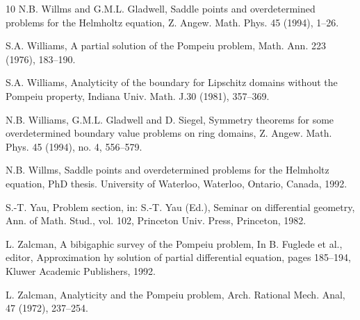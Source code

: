 \documentclass[12pt]{article}
\numberwithin{equation}{section}
\numberwithin{equation}{section}
\begin{document}
\begin{thebibliography}{10}
 N.B. Willms and G.M.L. Gladwell, Saddle points and overdetermined problems for the Helmholtz equation, Z. Angew. Math. Phys. 45 (1994), 1--26.

 S.A. Williams, A partial solution of the Pompeiu problem, Math. Ann. 223 (1976), 183--190.

 S.A. Williams, Analyticity of the boundary for Lipschitz domains without the Pompeiu property, Indiana Univ. Math. J.30 (1981), 357--369.

 N.B. Williams, G.M.L. Gladwell and D. Siegel, Symmetry theorems for some overdetermined boundary value problems on ring domains,
Z. Angew. Math. Phys. 45 (1994), no. 4, 556--579.


  N.B. Willms, Saddle points and overdetermined problems for the Helmholtz equation, PhD thesis. University of Waterloo, Waterloo, Ontario, Canada,
1992.


 S.-T. Yau, Problem section, in: S.-T. Yau (Ed.), Seminar on differential geometry, Ann. of Math. Stud., vol. 102,
Princeton Univ. Press, Princeton, 1982.

 L. Zalcman, A bibigaphic survey of the Pompeiu problem, In B. Fuglede
et al., editor, Approximation hy solution of partial differential equation, pages 185--194, Kluwer Academic Publishers, 1992.

 L. Zalcman, Analyticity and the Pompeiu problem, Arch. Rational Mech. Anal, 47 (1972), 237--254.
\end{thebibliography}
\end{document}

